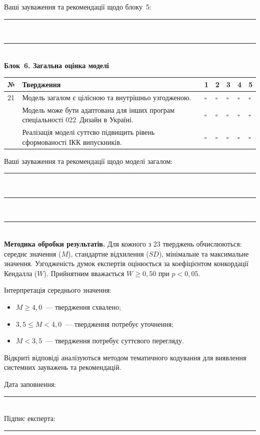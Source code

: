 Ваші зауваження та рекомендації щодо блоку~5:

\rule{\textwidth}{0.4pt}\\[0.3cm]
\rule{\textwidth}{0.4pt}\\[0.5cm]

\textbf{Блок~6. Загальна оцінка моделі}

\begin{longtable}{@{}p{}p{}p{}p{}p{}p{}p{}@{}}
\hline
\textbf{№} & \textbf{Твердження} & \textbf{1} & \textbf{2} & \textbf{3} & \textbf{4} & \textbf{5} \\
\hline
21 & Модель загалом є цілісною та внутрішньо узгодженою. & $\square$ & $\square$ & $\square$ & $\square$ & $\square$ \\
\addlinespace
22 & Модель може бути адаптована для інших програм спеціальності 022~Дизайн в Україні. & $\square$ & $\square$ & $\square$ & $\square$ & $\square$ \\
\addlinespace
23 & Реалізація моделі суттєво підвищить рівень сформованості ІКК випускників. & $\square$ & $\square$ & $\square$ & $\square$ & $\square$ \\
\hline
\end{longtable}

Ваші зауваження та рекомендації щодо моделі загалом:

\rule{\textwidth}{0.4pt}\\[0.3cm]
\rule{\textwidth}{0.4pt}\\[0.3cm]
\rule{\textwidth}{0.4pt}\\[0.5cm]

\textbf{Методика обробки результатів.} Для кожного з 23 тверджень обчислюються: середнє значення ($M$), стандартне відхилення ($SD$), мінімальне та максимальне значення. Узгодженість думок експертів оцінюється за коефіцієнтом конкордації Кендалла ($W$). Прийнятним вважається $W \geq 0{,}50$ при $p < 0{,}05$.

Інтерпретація середнього значення:
\begin{itemize}
    \item $M \geq 4{,}0$~--- твердження схвалено;
    \item $3{,}5 \leq M < 4{,}0$~--- твердження потребує уточнення;
    \item $M < 3{,}5$~--- твердження потребує суттєвого перегляду.
\end{itemize}

Відкриті відповіді аналізуються методом тематичного кодування для виявлення системних зауважень та рекомендацій.

\vspace{0.5cm}

\begin{flushright}
Дата заповнення: \rule{3cm}{0.4pt}\\[0.3cm]
Підпис експерта: \rule{3cm}{0.4pt}
\end{flushright}

\label{last_page}
